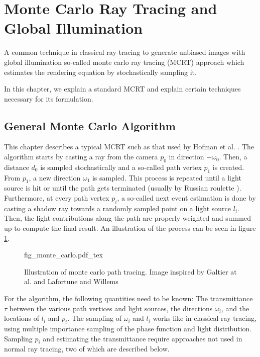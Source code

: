 \section{Monte Carlo Ray Tracing and Global Illumination}
\label{sec:mc}
A common technique in classical ray tracing to generate unbiased images with global illumination so-called monte carlo ray tracing (MCRT) approach \cite{mc_siggraph} which estimates the rendering equation by stochastically sampling it.

In this chapter, we explain a standard MCRT and explain certain techniques necessary for its formulation.
\subsection{General Monte Carlo Algorithm}
This chapter describes a typical MCRT such as that used by Hofman et al. \cite{10.1145/3451256}.
The algorithm starts by casting a ray from the camera $p_0$ in direction $-\omega_0$. Then, a distance $d_0$ is sampled stochastically and a so-called path vertex $p_1$ is created. From $p_1$, a new direction $\omega_1$ is sampled. This process is repeated until a light source is hit or until the path gets terminated (usually by Russian roulette \cite{P-766}). Furthermore, at every path vertex $p_i$, a so-called next event estimation \cite{10.1145/3305366.3328079} is done by casting a shadow ray towards a randomly sampled point on a light source $l_i$. Then, the light contributions along the path are properly weighted \cite{10.1145/218380.218498} and summed up to compute the final result.
An illustration of the process can be seen in figure \ref{fig:monte_carlo}.


\begin{figure}
\centering
\def\svgwidth{\columnwidth}
{fig_monte_carlo.pdf_tex}

\caption{Illustration of monte carlo path tracing. Image inspired by Galtier at al. \cite{GALTIER201357} and Lafortune and Willems \cite{bidirectional-ray-tracing}}
\label{fig:monte_carlo}
\end{figure}


For the algorithm, the following quantities need to be known: The transmittance $\tau$ between the various path vertices and light sources, the directions $\omega_i$, and the locations of $l_i$ and $p_i$.
The sampling of $\omega_i$ and $l_i$ works like in classical ray tracing, using multiple importance sampling\cite{10.1145/218380.218498} of the phase function and light distribution. Sampling $p_i$ and estimating the transmittance require approaches not used in normal ray tracing, two of which are described below. 
